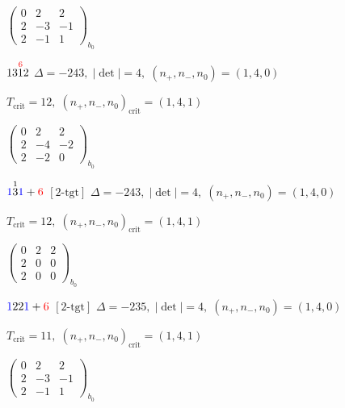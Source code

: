 \documentclass[10pt]{article}
\begin{document}
\hspace{2em}$\left(\begin{smallmatrix}0 & 2 & 2 \\ 2 & -3 & -1 \\ 2 & -1 & 1\end{smallmatrix}\right)_{\!b_0}$

\smallskip

$13\overset{\textcolor{red}{6}}{1}2$ \quad $\Delta=-243,\; |\det|=4,\; (n_+,n_-,n_0)=(1,4,0)$

\hspace{1em}$T_{\text{crit}}=12,\; (n_+,n_-,n_0)_{\text{crit}}=(1,4,1)$

\hspace{2em}$\left(\begin{smallmatrix}0 & 2 & 2 \\ 2 & -4 & -2 \\ 2 & -2 & 0\end{smallmatrix}\right)_{\!b_0}$

\smallskip

$\textcolor{blue}{1}\overset{1}{3}\textcolor{blue}{1}+\textcolor{red}{6}$ $\scriptstyle [2\text{-tgt}]$ \quad $\Delta=-243,\; |\det|=4,\; (n_+,n_-,n_0)=(1,4,0)$

\hspace{1em}$T_{\text{crit}}=12,\; (n_+,n_-,n_0)_{\text{crit}}=(1,4,1)$

\hspace{2em}$\left(\begin{smallmatrix}0 & 2 & 2 \\ 2 & 0 & 0 \\ 2 & 0 & 0\end{smallmatrix}\right)_{\!b_0}$

\smallskip

$\textcolor{blue}{1}22\textcolor{blue}{1}+\textcolor{red}{6}$ $\scriptstyle [2\text{-tgt}]$ \quad $\Delta=-235,\; |\det|=4,\; (n_+,n_-,n_0)=(1,4,0)$

\hspace{1em}$T_{\text{crit}}=11,\; (n_+,n_-,n_0)_{\text{crit}}=(1,4,1)$

\hspace{2em}$\left(\begin{smallmatrix}0 & 2 & 2 \\ 2 & -3 & -1 \\ 2 & -1 & 1\end{smallmatrix}\right)_{\!b_0}$
\end{document}
